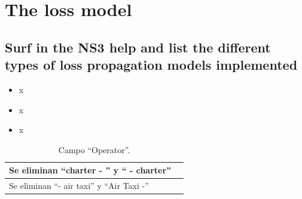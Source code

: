 \documentclass[a4paper,10pt]{article}
\begin{document}
\section{The loss model}

\subsection{Surf in the NS3 help and list the different types of loss propagation models implemented}
\begin{itemize}
\item x

\item x

\item x

\end{itemize}


\begin{table}[htbp]
\centering
\begin{tabular}{p{2cm} p{10cm}}
\hline \hline
Se eliminan ``charter - '' y `` - charter''&\\
\hline
Se eliminan ``- air taxi'' y ``Air Taxi -''&\\
\hline \hline

\end{tabular}
\caption{Campo ``Operator''.}
\label{tabla:autores}
\end{table}
\end{document}
